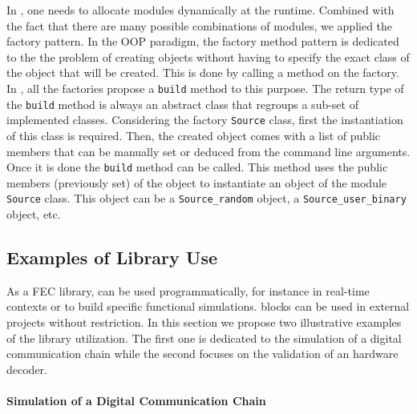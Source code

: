 In \AFFECT, one needs to allocate modules dynamically at the runtime. Combined
with the fact that there are many possible combinations of modules, we applied
the factory pattern. In the OOP paradigm, the factory method pattern is
dedicated to the the problem of creating objects without having to specify the
exact class of the object that will be created. This is done by calling a method
on the factory. In \AFFECT, all the factories propose a \verb|build| method to
this purpose. The return type of the \verb|build| method is always an abstract
class that regroups a sub-set of implemented classes. Considering the factory
\verb|Source| class, first the instantiation of this class is required. Then,
the created object comes with a list of public members that can be manually set
or deduced from the command line arguments. Once it is done the \verb|build|
method can be called. This method uses the public members (previously set) of
the object to instantiate an object of the module \verb|Source| class. This
object can be a \verb|Source_random| object, a \verb|Source_user_binary| object,
etc.

\subsection{Examples of Library Use}
\label{sec:aff3ct_library_example}

As a FEC library, \AFFECT can be used programmatically, for instance in
real-time contexts or to build specific functional simulations. \AFFECT blocks
can be used in external projects without restriction. In this section we propose
two illustrative examples of the \AFFECT library utilization. The first one is
dedicated to the simulation of a digital communication chain while the second
focuses on the validation of an hardware decoder.

\paragraph{Simulation of a Digital Communication Chain}

